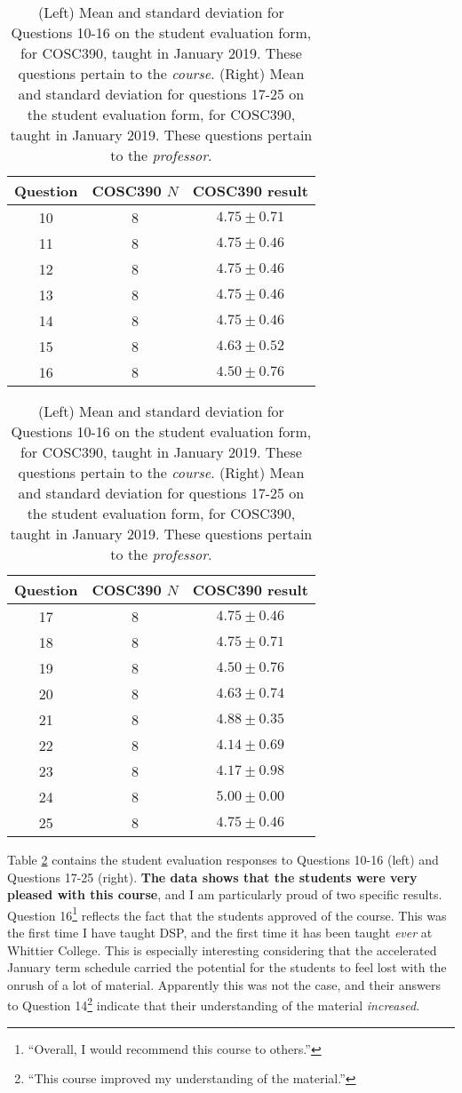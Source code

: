 \documentclass[../../main.tex]{subfiles}
\begin{document}
\label{sec:oof2}

\begin{table}
\small
\centering
\begin{tabular}{| c | c | c |}
\hline \hline
Question & COSC390 $N$ & COSC390 result \\ \hline
10 & 8 & $4.75\pm 0.71$ \\ \hline
11 & 8 & $4.75\pm 0.46$ \\ \hline
12 & 8 & $4.75\pm 0.46$ \\ \hline
13 & 8 & $4.75\pm 0.46$ \\ \hline
14 & 8 & $4.75\pm 0.46$ \\ \hline
15 & 8 & $4.63\pm 0.52$ \\ \hline
16 & 8 & $4.50\pm 0.76$ \\ \hline
\hline
\end{tabular}
\quad
\begin{tabular}{| c | c | c |}
\hline \hline
Question & COSC390 $N$ & COSC390 result \\ \hline
17 & 8 & $4.75\pm 0.46$ \\ \hline
18 & 8 & $4.75\pm 0.71$ \\ \hline
19 & 8 & $4.50\pm 0.76$ \\ \hline
20 & 8 & $4.63\pm 0.74$ \\ \hline
21 & 8 & $4.88\pm 0.35$ \\ \hline
22 & 8 & $4.14\pm 0.69$ \\ \hline
23 & 8 & $4.17\pm 0.98$ \\ \hline
24 & 8 & $5.00\pm 0.00$ \\ \hline
25 & 8 & $4.75\pm 0.46$ \\ \hline
\hline
\end{tabular}
\caption{\label{tab:courses:adv_eval_3} (Left) Mean and standard deviation for Questions 10-16 on the student evaluation form, for COSC390, taught in January 2019.  These questions pertain to the \textit{course}.  (Right) Mean and standard deviation for questions 17-25 on the student evaluation form, for COSC390, taught in January 2019.  These questions pertain to the \textit{professor}.}
\end{table}

Table \ref{tab:courses:adv_eval_3} contains the student evaluation responses to Questions 10-16 (left) and Questions 17-25 (right).  \textbf{The data shows that the students were very pleased with this course}, and I am particularly proud of two specific results.  Question 16\footnote{``Overall, I would recommend this course to others.''} reflects the fact that the students approved of the course.  This was the first time I have taught DSP, and the first time it has been taught \textit{ever} at Whittier College.  This is especially interesting considering that the accelerated January term schedule carried the potential for the students to feel lost with the onrush of a lot of material.  Apparently this was not the case, and their answers to Question 14\footnote{``This course improved my understanding of the material.''} indicate that their understanding of the material \textit{increased.} \\ \hspace{0.1cm}
\end{document}
